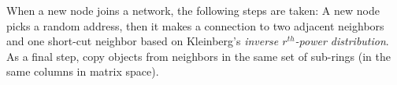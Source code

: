 \documentclass[conference]{IEEEtran}
\begin{document}
When a new node joins a network, the following steps are taken:
A new node picks a random address, then it makes a connection to two adjacent
neighbors and one short-cut neighbor based on Kleinberg's
\emph{inverse $r^{th}$-power distribution}. As a final step, copy objects 
from neighbors in the same set of sub-rings (in the same columns in matrix space).
\end{document}
